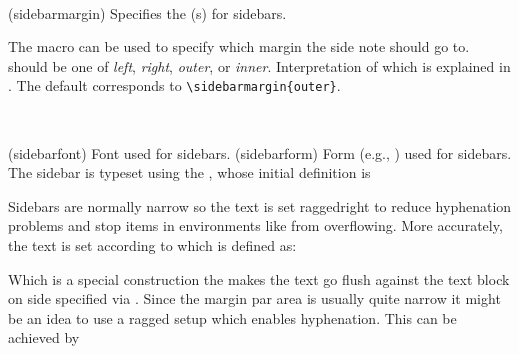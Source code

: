 \begin{syntax}
\cmd{\sidebarmargin} \\
\end{syntax}
\glossary(sidebarmargin)%
  {}%
  {Specifies the (s) for sidebars.}

The macro \cmd{\sidebarmargin} can be used to specify
which margin the side note should go to.  should be
one of \emph{left}, \emph{right}, \emph{outer}, or
\emph{inner}. Interpretation of which is explained in
. The default corresponds to \verb?\sidebarmargin{outer}?.


\begin{syntax}
\cmd{\sidebarfont} \cmd{\sidebarform} \\
\end{syntax}
\glossary(sidebarfont)%
  {}%
  {Font used for sidebars.}
\glossary(sidebarform)%
  {}%
  {Form (e.g., ) used for sidebars.}
The sidebar  is typeset using the \cmd{\sidebarfont}, whose initial
definition is
\begin{lcode}
\newcommand{\sidebarfont}{\normalsize\normalfont}
\end{lcode}
Sidebars are normally narrow so the text is 
set raggedright to 
reduce hyphenation
problems and stop items in environments like  from overflowing. 
More accurately, the text is set according to \cmd{\sidebarform} which is 
defined as:
\begin{lcode}
  \newcommand*{\sidebarform}{%
    \ifmemtortm\raggedright\else\raggedleft\fi}
\end{lcode}
Which is a special construction the makes the text go flush against the
text block on side specified via \cmd{\sideparmargin}. Since the
margin par area is usually quite narrow it might be an idea to use a
ragged setup which enables hyphenation. This can be achieved by
\begin{lcode}
  \usepackage{ragged2e}
  \newcommand*{\sidebarform}{%
    \ifmemtortm\RaggedRight\else\RaggedLeft\fi}
\end{lcode}



